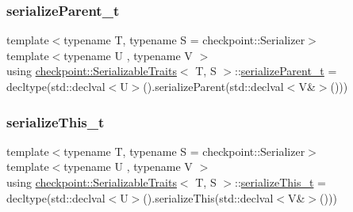 \subsubsection{\texorpdfstring{serialize\+Parent\+\_\+t}{serializeParent\_t}}
{\footnotesize\ttfamily template$<$typename T, typename S = checkpoint\+::\+Serializer$>$ \\
template$<$typename U , typename V $>$ \\
using \hyperlink{structcheckpoint_1_1_serializable_traits}{checkpoint\+::\+Serializable\+Traits}$<$ T, S $>$\+::\hyperlink{structcheckpoint_1_1_serializable_traits_a38585e5b9aa0653c08ff48504e922ad5}{serialize\+Parent\+\_\+t} =  decltype(std\+::declval$<$U$>$().serialize\+Parent(std\+::declval$<$V\&$>$()))}

\mbox{\label{structcheckpoint_1_1_serializable_traits_ac81eb64532a65d97dc995e582ef708ad}} 
\subsubsection{\texorpdfstring{serialize\+This\+\_\+t}{serializeThis\_t}}
{\footnotesize\ttfamily template$<$typename T, typename S = checkpoint\+::\+Serializer$>$ \\
template$<$typename U , typename V $>$ \\
using \hyperlink{structcheckpoint_1_1_serializable_traits}{checkpoint\+::\+Serializable\+Traits}$<$ T, S $>$\+::\hyperlink{structcheckpoint_1_1_serializable_traits_ac81eb64532a65d97dc995e582ef708ad}{serialize\+This\+\_\+t} =  decltype(std\+::declval$<$U$>$().serialize\+This(std\+::declval$<$V\&$>$()))}

\mbox{\label{structcheckpoint_1_1_serializable_traits_a5a1f289a5008468335f22e288a96d861}} 

